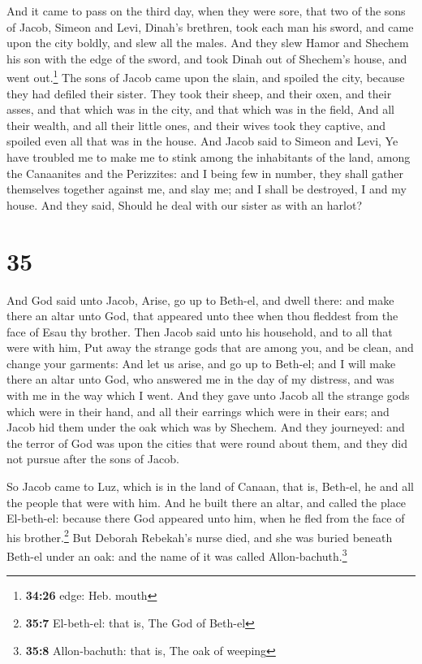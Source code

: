  And it came to pass on the third day, when they were
sore, that two of the sons of Jacob, Simeon and Levi, Dinah's brethren,
took each man his sword, and came upon the city boldly, and slew all the
males.  And they slew Hamor and Shechem his son with the
edge of the sword, and took Dinah out of Shechem's house, and went
out.\footnote{\textbf{34:26} edge: Heb. mouth}  The sons
of Jacob came upon the slain, and spoiled the city, because they had
defiled their sister.  They took their sheep, and their
oxen, and their asses, and that which was in the city, and that which
was in the field,  And all their wealth, and all their
little ones, and their wives took they captive, and spoiled even all
that was in the house.  And Jacob said to Simeon and
Levi, Ye have troubled me to make me to stink among the inhabitants of
the land, among the Canaanites and the Perizzites: and I being few in
number, they shall gather themselves together against me, and slay me;
and I shall be destroyed, I and my house.  And they said,
Should he deal with our sister as with an harlot?

\hypertarget{section-34}{%
\section{35}\label{section-34}}

 And God said unto Jacob, Arise, go up to Beth-el, and
dwell there: and make there an altar unto God, that appeared unto thee
when thou fleddest from the face of Esau thy brother. 
Then Jacob said unto his household, and to all that were with him, Put
away the strange gods that are among you, and be clean, and change your
garments:  And let us arise, and go up to Beth-el; and I
will make there an altar unto God, who answered me in the day of my
distress, and was with me in the way which I went.  And
they gave unto Jacob all the strange gods which were in their hand, and
all their earrings which were in their ears; and Jacob hid them under
the oak which was by Shechem.  And they journeyed: and the
terror of God was upon the cities that were round about them, and they
did not pursue after the sons of Jacob.

 So Jacob came to Luz, which is in the land of Canaan,
that is, Beth-el, he and all the people that were with him.
 And he built there an altar, and called the place
El-beth-el: because there God appeared unto him, when he fled from the
face of his brother.\footnote{\textbf{35:7} El-beth-el: that is, The God
  of Beth-el}  But Deborah Rebekah's nurse died, and she
was buried beneath Beth-el under an oak: and the name of it was called
Allon-bachuth.\footnote{\textbf{35:8} Allon-bachuth: that is, The oak of
  weeping}

